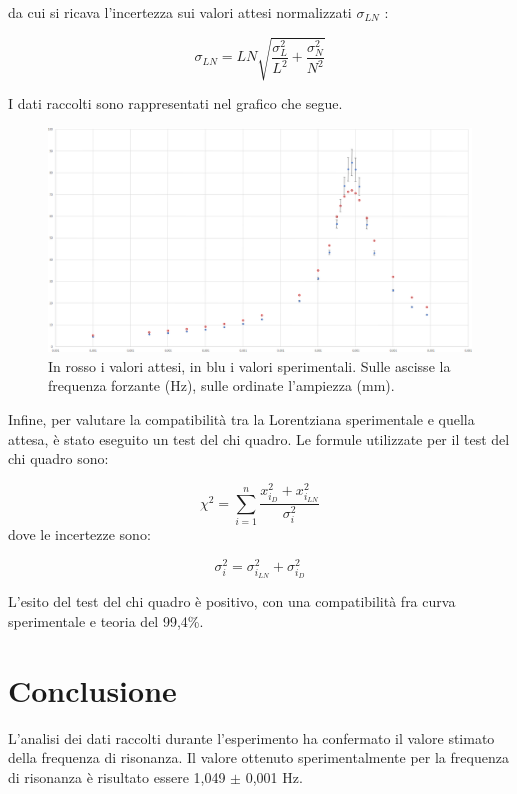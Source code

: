 \documentclass[12pt]{article}
\begin{document}
da cui si ricava l'incertezza sui valori attesi normalizzati $\sigma_{LN}$ :

\[
  \sigma_{LN}=LN\sqrt{\frac{\sigma_L^2}{L^2}+\frac{\sigma_N^2}{N^2}}
\]

I dati raccolti sono rappresentati nel grafico che segue.
\begin{figure}[htbp]
  \centering
  \includegraphics[width=1.0\textwidth]{grafico.png}
  \captionsetup{labelformat=empty}
  \caption{In rosso i valori attesi, in blu i valori sperimentali. Sulle ascisse la frequenza forzante (Hz), sulle ordinate l'ampiezza (mm).}
  \label{fig:grafico}
\end{figure}

Infine, per valutare la compatibilità tra la Lorentziana sperimentale e quella attesa, è stato eseguito un test del chi quadro. Le formule utilizzate per il test del chi quadro sono:

\[ \chi^2=\sum_{i=1}^{n}\frac{x_{i_{D}}^2+x_{i_{LN}}^2}{\sigma_i^2} \]
dove le incertezze sono:

\[ \sigma_i^2=\sigma_{i_{LN}}^2+\sigma_{i_{D}}^2 \]

L'esito del test del chi quadro è positivo, con una compatibilità fra curva sperimentale e teoria del 99,4\%.


\section{Conclusione}

L'analisi dei dati raccolti durante l'esperimento ha confermato il valore stimato della frequenza di risonanza. Il valore ottenuto sperimentalmente per la frequenza di risonanza è risultato essere 1,049 $\pm$ 0,001 Hz.
\end{document}

